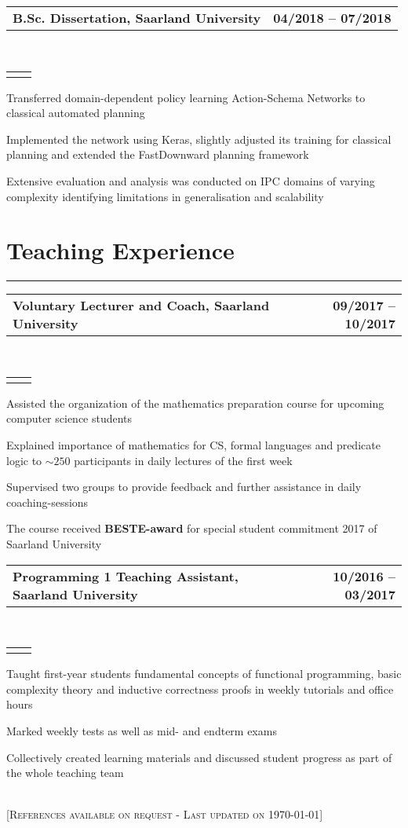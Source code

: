 \documentclass[]{deedy-resume}
\makeatletter
\newcommand{\headerrow}[2]
{\begin{tabular*}{\linewidth}{l@{\extracolsep{\fill}}r}
	\fontspec{Helvetica}\fontsize{12pt}{12pt}\selectfont\bfseries{\color{subheadings}#1} &
	\fontspec{Helvetica}\fontsize{12pt}{12pt}\selectfont\bfseries{\color{subheadings}#2} \\
\end{tabular*}}
\newcommand{\locationrow}[2]
{\begin{tabular*}{\linewidth}{l@{\extracolsep{\fill}}r}
        \color{headings}\scshape\fontspec{Heiti TC Medium}\fontsize{10pt}{12pt}\selectfont{#1}  &
        \color{headings}\scshape\fontspec{Heiti TC Medium}\fontsize{10pt}{12pt}\selectfont{#2}  \\
\end{tabular*}}
\makeatother
\begin{document}
\noindent
\headerrow{B.Sc. Dissertation, Saarland University}{04/2018 -- 07/2018}
\\
\locationrow{Foundations of Artificial Intelligence (FAI) Group}{}
\begin{tightitemize}{1.7em}
    \item Transferred domain-dependent policy learning Action-Schema Networks to
    classical automated planning
    \item Implemented the network using Keras, slightly adjusted its training for classical planning and extended 
    the FastDownward planning framework
    \item Extensive evaluation and analysis was conducted on IPC domains of varying complexity identifying
    limitations in generalisation and scalability
\end{tightitemize}
\largesectionsep


\section*{Teaching Experience}
\hrule
\vspace{0.4em}

\noindent
\headerrow{Voluntary Lecturer and Coach, Saarland University}{09/2017 -- 10/2017}
\\
\locationrow{Mathematics Preparation Course}{}
\begin{tightitemize}{1.7em}
    \item Assisted the organization of the mathematics preparation course for upcoming computer science students%
    \item Explained importance of mathematics for CS, formal languages and predicate logic to $\sim250$ participants in daily lectures of the first week
    \item Supervised two groups to provide feedback and further assistance in daily coaching-sessions
    \item The course received \textbf{BESTE-award} for special student commitment 2017 of Saarland University
\end{tightitemize}
\largesectionsep

\noindent
\headerrow{Programming 1 Teaching Assistant, Saarland University}{10/2016 -- 03/2017}
\\
\locationrow{Dependable Systems and Software Group}{}
\begin{tightitemize}{1.7em}
    \item Taught first-year students fundamental concepts of functional programming, basic complexity theory and inductive correctness proofs in weekly tutorials and office hours
    \item Marked weekly tests as well as mid- and endterm exams
    \item Collectively created learning materials and discussed student progress as part of the whole teaching team
\end{tightitemize}
\largesectionsep

\ \\

[\scshape{}\fontsize{10pt}{8pt}\selectfont References available on request - Last updated on \today]
\end{document}
